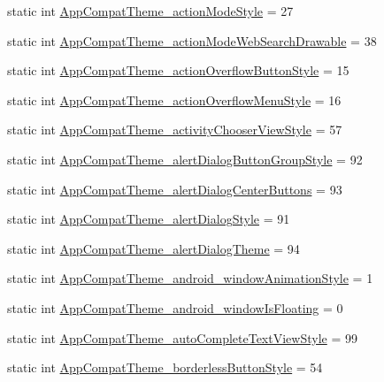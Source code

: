 \begin{DoxyCompactItemize}
\item 
static int \hyperlink{classandroid_1_1support_1_1v4_1_1R_1_1styleable_a971a9ca17c81aa97a72178cc5f548ec6}{App\+Compat\+Theme\+\_\+action\+Mode\+Style} = 27
\item 
static int \hyperlink{classandroid_1_1support_1_1v4_1_1R_1_1styleable_a0f006cb9d33142dc621ea6ea9cd07941}{App\+Compat\+Theme\+\_\+action\+Mode\+Web\+Search\+Drawable} = 38
\item 
static int \hyperlink{classandroid_1_1support_1_1v4_1_1R_1_1styleable_a3d2d5375ec6b6f4b8c965c1a321d256a}{App\+Compat\+Theme\+\_\+action\+Overflow\+Button\+Style} = 15
\item 
static int \hyperlink{classandroid_1_1support_1_1v4_1_1R_1_1styleable_a409729e91a9f66ebb049d84ae7efa9cc}{App\+Compat\+Theme\+\_\+action\+Overflow\+Menu\+Style} = 16
\item 
static int \hyperlink{classandroid_1_1support_1_1v4_1_1R_1_1styleable_a52ee8fc4fb3df2bd060e60002e7c3fd2}{App\+Compat\+Theme\+\_\+activity\+Chooser\+View\+Style} = 57
\item 
static int \hyperlink{classandroid_1_1support_1_1v4_1_1R_1_1styleable_a14ef4f0115ef99be0cd37f57ee57210e}{App\+Compat\+Theme\+\_\+alert\+Dialog\+Button\+Group\+Style} = 92
\item 
static int \hyperlink{classandroid_1_1support_1_1v4_1_1R_1_1styleable_af89ac865778b38e2eee143370582e60a}{App\+Compat\+Theme\+\_\+alert\+Dialog\+Center\+Buttons} = 93
\item 
static int \hyperlink{classandroid_1_1support_1_1v4_1_1R_1_1styleable_a7ef5fa1da3e7689dcf99a6e3e7d47d88}{App\+Compat\+Theme\+\_\+alert\+Dialog\+Style} = 91
\item 
static int \hyperlink{classandroid_1_1support_1_1v4_1_1R_1_1styleable_acb7db297ea9150b5e0877e2de9f24603}{App\+Compat\+Theme\+\_\+alert\+Dialog\+Theme} = 94
\item 
static int \hyperlink{classandroid_1_1support_1_1v4_1_1R_1_1styleable_aecefaedc85497e957c68a6189e441d7c}{App\+Compat\+Theme\+\_\+android\+\_\+window\+Animation\+Style} = 1
\item 
static int \hyperlink{classandroid_1_1support_1_1v4_1_1R_1_1styleable_a27ce7dec7f28ef2ad9633dddcb3bb204}{App\+Compat\+Theme\+\_\+android\+\_\+window\+Is\+Floating} = 0
\item 
static int \hyperlink{classandroid_1_1support_1_1v4_1_1R_1_1styleable_a7aa1a2971f395765ecd403cc29ee5c95}{App\+Compat\+Theme\+\_\+auto\+Complete\+Text\+View\+Style} = 99
\item 
static int \hyperlink{classandroid_1_1support_1_1v4_1_1R_1_1styleable_a9ac1a4d55b1bb5250eb7fe7f9c455bfe}{App\+Compat\+Theme\+\_\+borderless\+Button\+Style} = 54

\end{DoxyCompactItemize}
